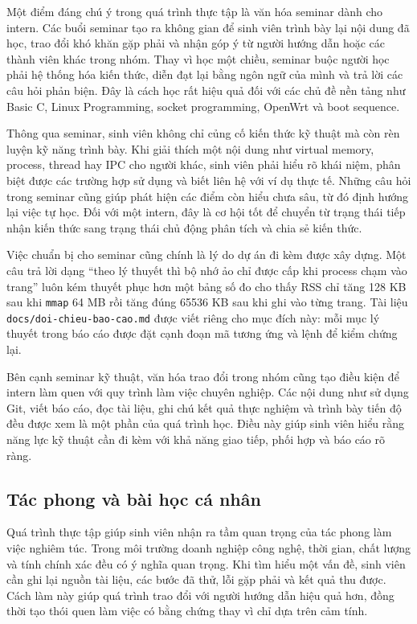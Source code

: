 \documentclass[11pt]{article}
\newcommand{\code}[1]{\texttt{#1}}
\begin{document}
Một điểm đáng chú ý trong quá trình thực tập là văn hóa seminar dành cho intern. Các buổi seminar tạo ra không gian để sinh viên trình bày lại nội dung đã học, trao đổi khó khăn gặp phải và nhận góp ý từ người hướng dẫn hoặc các thành viên khác trong nhóm. Thay vì học một chiều, seminar buộc người học phải hệ thống hóa kiến thức, diễn đạt lại bằng ngôn ngữ của mình và trả lời các câu hỏi phản biện. Đây là cách học rất hiệu quả đối với các chủ đề nền tảng như Basic C, Linux Programming, socket programming, OpenWrt và boot sequence.

Thông qua seminar, sinh viên không chỉ củng cố kiến thức kỹ thuật mà còn rèn luyện kỹ năng trình bày. Khi giải thích một nội dung như virtual memory, process, thread hay IPC cho người khác, sinh viên phải hiểu rõ khái niệm, phân biệt được các trường hợp sử dụng và biết liên hệ với ví dụ thực tế. Những câu hỏi trong seminar cũng giúp phát hiện các điểm còn hiểu chưa sâu, từ đó định hướng lại việc tự học. Đối với một intern, đây là cơ hội tốt để chuyển từ trạng thái tiếp nhận kiến thức sang trạng thái chủ động phân tích và chia sẻ kiến thức.

Việc chuẩn bị cho seminar cũng chính là lý do dự án đi kèm được xây dựng. Một câu trả lời dạng ``theo lý thuyết thì bộ nhớ ảo chỉ được cấp khi process chạm vào trang'' luôn kém thuyết phục hơn một bảng số đo cho thấy RSS chỉ tăng 128 KB sau khi \code{mmap} 64 MB rồi tăng đúng 65536 KB sau khi ghi vào từng trang. Tài liệu \code{docs/doi-chieu-bao-cao.md} được viết riêng cho mục đích này: mỗi mục lý thuyết trong báo cáo được đặt cạnh đoạn mã tương ứng và lệnh để kiểm chứng lại.

Bên cạnh seminar kỹ thuật, văn hóa trao đổi trong nhóm cũng tạo điều kiện để intern làm quen với quy trình làm việc chuyên nghiệp. Các nội dung như sử dụng Git, viết báo cáo, đọc tài liệu, ghi chú kết quả thực nghiệm và trình bày tiến độ đều được xem là một phần của quá trình học. Điều này giúp sinh viên hiểu rằng năng lực kỹ thuật cần đi kèm với khả năng giao tiếp, phối hợp và báo cáo rõ ràng.

\subsection{Tác phong và bài học cá nhân}

Quá trình thực tập giúp sinh viên nhận ra tầm quan trọng của tác phong làm việc nghiêm túc. Trong môi trường doanh nghiệp công nghệ, thời gian, chất lượng và tính chính xác đều có ý nghĩa quan trọng. Khi tìm hiểu một vấn đề, sinh viên cần ghi lại nguồn tài liệu, các bước đã thử, lỗi gặp phải và kết quả thu được. Cách làm này giúp quá trình trao đổi với người hướng dẫn hiệu quả hơn, đồng thời tạo thói quen làm việc có bằng chứng thay vì chỉ dựa trên cảm tính.
\end{document}
